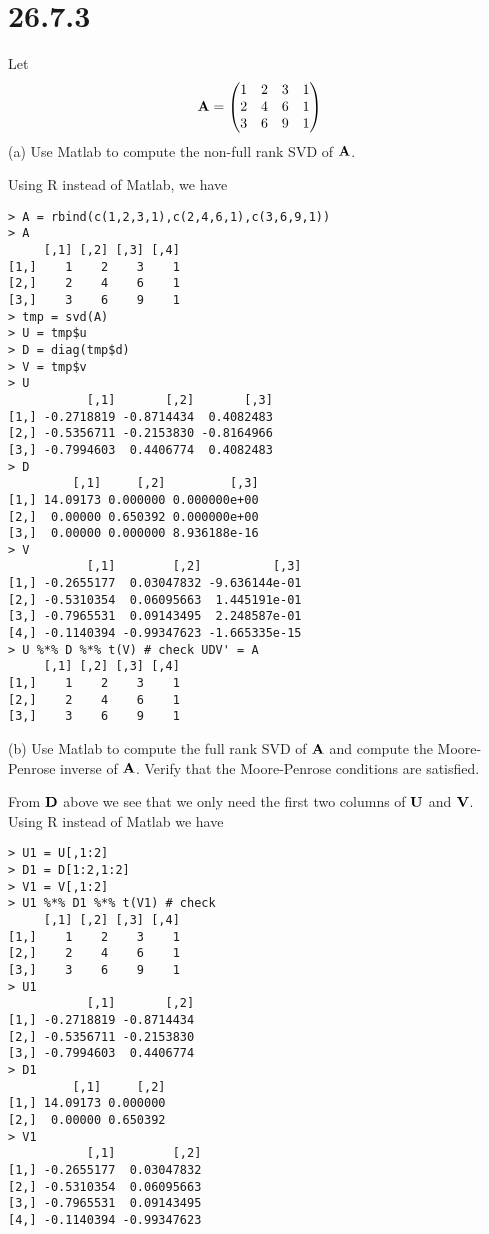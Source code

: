 \section*{26.7.3}
Let
$${\bf A}=\left(\begin{matrix}
1 & 2 & 3 & 1\cr
2 & 4 & 6 & 1\cr
3 & 6 & 9 & 1
\end{matrix}\right)
$$
(a) Use Matlab to compute the non-full rank SVD of $\bf A$.

\bigskip
\noindent
Using R instead of Matlab, we have
\begin{verbatim}
> A = rbind(c(1,2,3,1),c(2,4,6,1),c(3,6,9,1))
> A
     [,1] [,2] [,3] [,4]
[1,]    1    2    3    1
[2,]    2    4    6    1
[3,]    3    6    9    1
> tmp = svd(A)
> U = tmp$u
> D = diag(tmp$d)
> V = tmp$v
> U
           [,1]       [,2]       [,3]
[1,] -0.2718819 -0.8714434  0.4082483
[2,] -0.5356711 -0.2153830 -0.8164966
[3,] -0.7994603  0.4406774  0.4082483
> D
         [,1]     [,2]         [,3]
[1,] 14.09173 0.000000 0.000000e+00
[2,]  0.00000 0.650392 0.000000e+00
[3,]  0.00000 0.000000 8.936188e-16
> V
           [,1]        [,2]          [,3]
[1,] -0.2655177  0.03047832 -9.636144e-01
[2,] -0.5310354  0.06095663  1.445191e-01
[3,] -0.7965531  0.09143495  2.248587e-01
[4,] -0.1140394 -0.99347623 -1.665335e-15
> U %*% D %*% t(V) # check UDV' = A
     [,1] [,2] [,3] [,4]
[1,]    1    2    3    1
[2,]    2    4    6    1
[3,]    3    6    9    1
\end{verbatim}

\bigskip
\noindent
(b) Use Matlab to compute the full rank SVD of $\bf A$
and compute the Moore-Penrose inverse of $\bf A$.
Verify that the Moore-Penrose conditions are satisfied.

\bigskip
\noindent
From $\bf D$ above we see that we only need the first two columns
of $\bf U$ and $\bf V$.
Using R instead of Matlab we have
\begin{verbatim}
> U1 = U[,1:2]
> D1 = D[1:2,1:2]
> V1 = V[,1:2]
> U1 %*% D1 %*% t(V1) # check
     [,1] [,2] [,3] [,4]
[1,]    1    2    3    1
[2,]    2    4    6    1
[3,]    3    6    9    1
> U1
           [,1]       [,2]
[1,] -0.2718819 -0.8714434
[2,] -0.5356711 -0.2153830
[3,] -0.7994603  0.4406774
> D1
         [,1]     [,2]
[1,] 14.09173 0.000000
[2,]  0.00000 0.650392
> V1
           [,1]        [,2]
[1,] -0.2655177  0.03047832
[2,] -0.5310354  0.06095663
[3,] -0.7965531  0.09143495
[4,] -0.1140394 -0.99347623
\end{verbatim}

